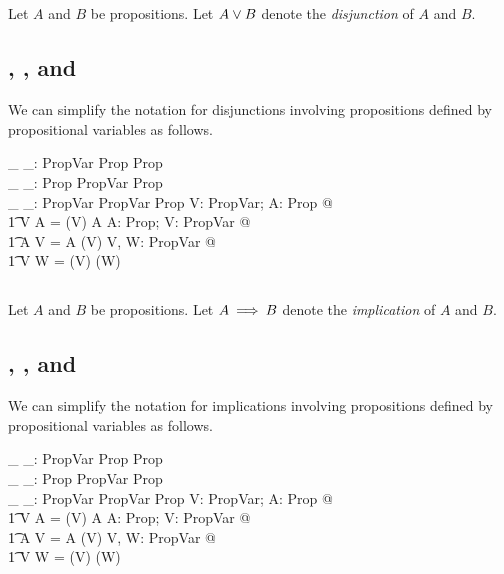 \documentclass[11pt, oneside]{article}
\begin{document}
\subsection{}

Let $A$ and $B$ be propositions.
Let $A \mathbin{\lor} B$ denote the {\it disjunction} of $A$ and $B$.

\subsection{, , and }

We can simplify the notation for disjunctions involving propositions defined by propositional variables as follows.

\begin{axdef}
	\_ \orPropVP \_: PropVar \cross Prop \inj Prop \\
	\_ \orPropPV \_: Prop \cross PropVar \inj Prop \\
	\_ \orPropVV \_: PropVar \cross PropVar \inj Prop
\where
	\forall V: PropVar; A: Prop @ \\
	\t1	V \orPropVP A = (\varProp V) \orProp A
\also
	\forall A: Prop; V: PropVar @ \\
	\t1	A \orPropPV V = A \orProp (\varProp V)
\also
	\forall V, W: PropVar @ \\
	\t1	V \orPropVV W = (\varProp V) \orProp (\varProp W)
\end{axdef}

\subsection{}

Let $A$ and $B$ be propositions.
Let $A \mathbin{\implies} B$ denote the {\it implication} of $A$ and $B$.

\subsection{, , and }

We can simplify the notation for implications involving propositions defined by propositional variables as follows.

\begin{axdef}
	\_ \impliesPropVP \_: PropVar \cross Prop \inj Prop \\
	\_ \impliesPropPV \_: Prop \cross PropVar \inj Prop \\
	\_ \impliesPropVV \_: PropVar \cross PropVar \inj Prop
\where
	\forall V: PropVar; A: Prop @ \\
	\t1	V \impliesPropVP A = (\varProp V) \impliesProp A
\also
	\forall A: Prop; V: PropVar @ \\
	\t1	A \impliesPropPV V = A \impliesProp (\varProp V)
\also
	\forall V, W: PropVar @ \\
	\t1	V \impliesPropVV W = (\varProp V) \impliesProp (\varProp W)
\end{axdef}
\end{document}
